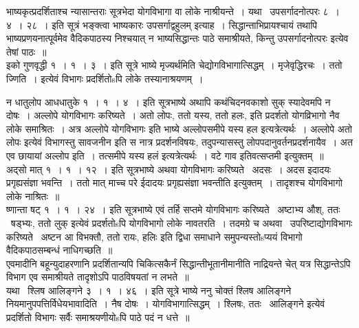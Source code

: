 \documentclass[11pt, openany]{book}
\begin{document}
भाष्यकृत्प्रदर्शिताश्च न्यासान्तराः सूत्रभेदा योगविभागा वा लोके नाश्रीयन्ते~। यथा \textendash\ उपसर्गादनोत्परः ८~। ४~। २८~। इति सूत्रं भङ्क्त्वा भाष्यकारः {\qt उपसर्गाद्वहुलम्} इत्याह~। सिद्धान्ताभिप्रायश्चायं तथापि भाष्यप्रणयनात्पूर्वमेव वैदिकपाठस्य निश्चयात् न भाष्यसिद्धान्तः पाठे समाश्रीयते, किन्तु {\qt उपसर्गादनोत्परः} इत्येव तेषां पाठः~॥\\

इको गुणवृद्धी १~। १~। ३~। इति सूत्रे भाष्ये {\qt मृज्यर्थमिति चेद्योगविभागात्सिद्धम्~। मृजेवृद्धिरचः~। ततो ज्णिति~।} इत्येवं विभागः प्रदर्शितोsपि लोके तस्यानाश्रयणम्~।

\newpage

न धातुलोप आधधातुके १~। १~। ४~। इति सूत्रभाष्ये अथापि कथंचिदनवकाशो सुक् स्यादेवमपि न दोषः~। अल्लोपे योगविभागः करिष्यते~। अतो लोपः, ततो यस्य, ततो हलः, इति प्रदर्शतो योगव्रिभागो नैव लोके समाश्रितः~। अत्र {\qt अल्लोपे योगविभागः} इति भाष्ये अल्लोपसमीपे यस्य हल इत्यत्रेत्यर्थः~। अल्लोपे अतो लोपः इत्येवं विभागस्तु सावजनीन इति स नात्र प्रदर्शनविषयः, तदुपन्यासस्तु लोपपदानुवर्तनप्रदर्शनायैव~। अत एव छायायां {\qt अल्लोप इति~। तत्समीपे यस्य हलं इत्यत्रेत्यर्थः~। वटे गाव इतिवत्सप्तमी} इत्युक्तम्~॥\\

अद्सो मात् १~। १~। १२~। इति सूत्रभाष्ये अथवा योगविभागः करिष्यते \textendash\ अदसः~। अदस इदादयः प्रगृह्यसंज्ञा भवन्ति~। ततो {\qt मात्} माच्च परे ईदादयः प्रगृह्यसंज्ञा भवन्तीति इत्युक्तम्~। तादृशश्च योगविभागो लोके नाश्रितः~॥\\

ष्णान्ता षट् १~। १~। २४~। इति सूत्रभाष्ये {\qt एवं तर्हि सप्तमे योगविभागः करिष्यते \textendash\ अष्टाभ्य औश्, ततः \textendash\ षड्भ्यः, ततो लुक्} इत्येवं प्रदर्शतोsपि योगविभागो लोके नावतरति~। तदमग्रे च {\qt अथवा \textendash\ उपरिष्टाद्योगविभागः करिष्यते \textendash\ अष्टन आ विभक्तौ, ततो रायः, हलिः} इति द्विधा समाधाने समुपन्यस्तोsप्ययं विभागो वैदिकपाठसम्बन्धं नाधिगच्छति~॥\\

एवमादीनि बहून्युदाहरणानि प्रदर्शितान्यपि चिकित्सकैर्नं सिद्धान्तीभूतानीमानीति नाद्रियन्ते चेत् यत्र सिद्धान्तेऽपि विभाग एव समाश्रीयते तादृशोऽपि पाठविषयतां न लभते~॥\\

यथा \textendash\ श्लिष आलिङ्गने ३~। १~। ४६~। इति सूत्रे भाष्ये ननु चोक्तं श्लिष आलिङ्गने नियमानुपपत्तिर्विधेयभावादिति~। नैष दोषः~। योगविभागात्सिद्धम्~। श्लिषः, ततः \textendash\ {\qt आलिङ्गने} इत्येवं प्रदर्शितो विभागः सर्वैः समाश्रयणीयोsपि पाठे पदं न धत्ते~॥\\
\end{document}
